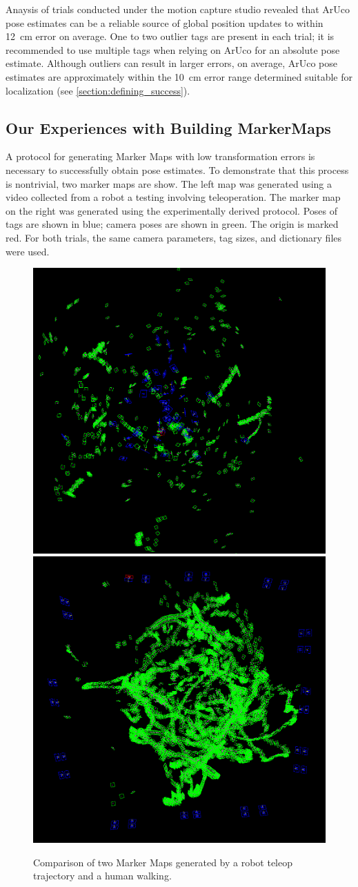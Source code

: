 \documentclass{article}
\begin{document}
    Anaysis of trials conducted under the motion capture studio revealed that ArUco pose estimates can be a reliable source of global position updates to within \SI{12}{\centi\meter} error on average. One to two outlier tags are present in each trial; it is recommended to use multiple tags when relying on ArUco for an absolute pose estimate. Although outliers can result in larger errors, on average, ArUco pose estimates are approximately within the \SI{10}{\centi\meter} error range determined suitable for localization (see \ref{section:defining_success}).

	\subsection{Our Experiences with Building MarkerMaps} \label{section:building_maps_sucks}
    A protocol for generating Marker Maps with low transformation errors is necessary to successfully obtain pose estimates. To demonstrate that this process is nontrivial, two marker maps are show. The left map was generated using a video collected from a robot a testing involving teleoperation. The marker map on the right was generated using the experimentally derived protocol. Poses of tags are shown in blue; camera poses are shown in green. The origin is marked red. For both trials, the same camera parameters, tag sizes, and dictionary files were used.

    \begin{figure}[H]
      \centering
      \includegraphics[width=0.49\linewidth]{./images/marker_mapper_example_bad.png}
      \includegraphics[width=0.49\linewidth]{./images/marker_mapper_good_ps3_3_17.png}
      \caption{Comparison of two Marker Maps generated by a robot teleop trajectory and a human walking.}
      \label{fig:marker_mapper_comparison}
    \end{figure}
\end{document}
